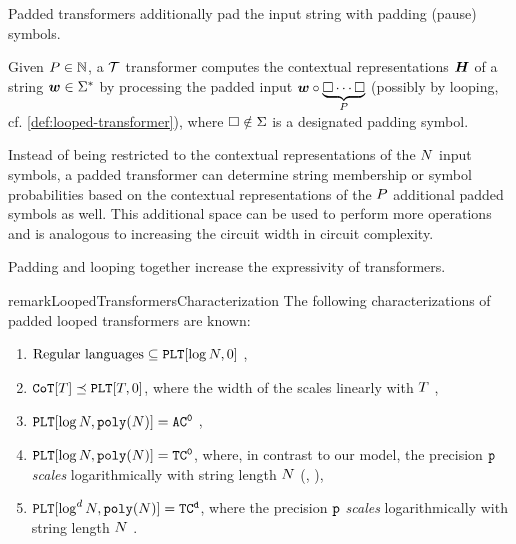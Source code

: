 Padded transformers additionally pad the input string with padding (pause) symbols.
\begin{definition} \label{def:padded-transformer}
   Given ${P} \in {{\mathbb{N}}}$, a  ${{\mathcal{T}}}$ transformer computes the contextual representations ${{{{{{{\bm{H}}}}}}}}$ of a string ${{\boldsymbol{w}}} \in {{{{{{\Sigma}}^{*}}}}}$ by processing the padded input ${{\boldsymbol{w}}} \circ \underbrace{{\square} \cdots {\square}}_{{P}}$ (possibly by looping, cf. \cref{def:looped-transformer}), where ${\square} \notin {{\Sigma}}$ is a designated padding symbol.
\end{definition}
Instead of being restricted to the contextual representations of the ${{N}}$ input symbols, a padded transformer can determine string membership or symbol probabilities based on the contextual representations of the ${P}$ additional padded symbols as well.
This additional space can be used to perform more operations and is analogous to increasing the circuit width in circuit complexity.

Padding and looping together increase the expressivity of transformers.
\begin{restatable}{remark}{LoopedTransformersCharacterization} \label{thm:looped-transformers-characterization}
   The following characterizations of padded looped transformers are known:
   \begin{enumerate}[label=(\arabic*)]
      \item $\text{Regular languages} \subseteq {\mathtt{PLT}}[\log{{N}}, 0]$ \citep[][Thm. 5.1]{saunshi2025reasoninglatentthoughtspower}, 
      \item ${\mathtt{CoT}}[{T}] \preceq {\mathtt{PLT}}[{T}, 0]$, where the width of the \LTAcr scales linearly with ${T}$ \citep[][Thm. 5.4]{saunshi2025reasoninglatentthoughtspower}, 
      \item $\LTClass[\log\strlen, \polyFun{\strlen}] = \ACZero$ \citep[][Thm. 4.1]{london2025pausetokensstrictlyincrease}, 
      \item $\LTClass[\log\strlen, \polyFun{\strlen}] = \TCZero$, where, in contrast to our model, the precision ${{\texttt{p}}}$ \emph{scales} logarithmically with string length ${{N}}$ (\citet[][Thm. 4.5]{london2025pausetokensstrictlyincrease}, \citet[][Thm. 1]{merrill2025exactexpressivepowertransformers}),
      \item $\LTClass[\log^d{\strlen}, \polyFun{\strlen}] = \TCd$, where the precision ${{\texttt{p}}}$ \emph{scales} logarithmically with string length ${{N}}$ \citep[][Thm. 3]{merrill2025exactexpressivepowertransformers}. 
   \end{enumerate}
\end{restatable}

